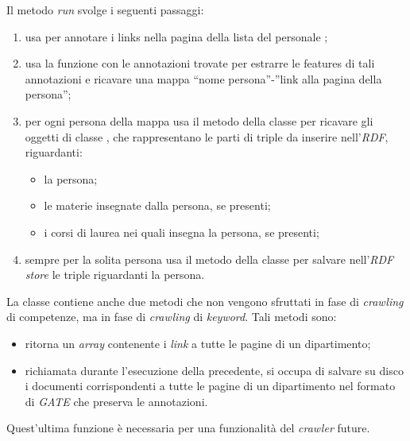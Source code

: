 \documentclass[tesi.tex]{subfiles}
\begin{document}
Il metodo \emph{run} svolge i seguenti passaggi:
\begin{enumerate}
\item usa  per annotare i links nella pagina della
  lista del personale ;
\item usa la funzione  con le annotazioni trovate
  per estrarre le features di tali annotazioni e ricavare una mappa
  ``nome persona''-''link alla pagina della persona'';
\item per ogni persona della mappa usa il metodo  della classe 
  per ricavare gli oggetti di classe , che
  rappresentano le parti di triple da inserire nell'\emph{RDF},
  riguardanti:
  \begin{itemize}
  \item la persona;
  \item le materie insegnate dalla persona, se presenti;
  \item i corsi di laurea nei quali insegna la persona, se presenti;
  \end{itemize}
\item sempre per la solita persona usa il metodo  della classe
   per salvare nell'\emph{RDF store} le
  triple riguardanti la persona.
\end{enumerate}

La classe contiene anche due metodi che non vengono sfruttati in fase
di \emph{crawling} di competenze, ma in fase di \emph{crawling} di
\emph{keyword}. Tali metodi sono:
\begin{itemize}
  \item {} ritorna un \emph{array} contenente i
    \emph{link} a tutte le pagine di un dipartimento;
  \item {} richiamata durante l'esecuzione della
    precedente, si occupa di salvare su disco i documenti
    corrispondenti a tutte le pagine di un dipartimento nel formato di
    \emph{GATE} che preserva le annotazioni.
\end{itemize}
Quest'ultima funzione \`e necessaria per una funzionalit\`a del
\emph{crawler} future.
\end{document}
